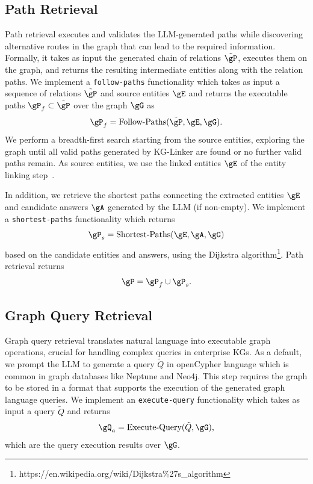 \documentclass[11pt]{article}
\begin{document}
\subsection{Path Retrieval}
Path retrieval executes and validates the LLM-generated paths while discovering alternative routes in the graph that can lead to the required information.
Formally, it takes as input the generated chain of relations $\tilde{\gP}$, executes them on the graph, and returns the resulting intermediate entities along with the relation paths. We implement a \texttt{follow-paths} functionality which takes as input a sequence of relations $\tilde{\gP}$ and source entities $\gE$ and returns the executable paths $\gP_f \subset \tilde{\gP}$ over the graph $\gG$ as
\begin{equation}
    \gP_f = \text{Follow-Paths}(\tilde{\gP}, \gE, \gG).
\end{equation}
We perform a breadth-first search starting from the source entities, exploring the graph until all valid paths generated by KG-Linker are found or no further valid paths remain. As source entities, we use the linked entities $\gE$ of the entity linking step~.

In addition, we retrieve the shortest paths connecting the extracted entities $\gE$ and candidate answers $\gA$ generated by the LLM (if non-empty). We implement a \texttt{shortest-paths} functionality which returns
\begin{equation}
    \gP_s = \text{Shortest-Paths}(\gE, \gA, \gG)
\end{equation}
based on the candidate entities and answers, using the Dijkstra algorithm\footnote{https://en.wikipedia.org/wiki/Dijkstra\%27s\_algorithm}. Path retrieval returns
\begin{equation}
    \gP = \gP_f \cup \gP_s.
\end{equation}

\subsection{Graph Query Retrieval}
Graph query retrieval translates natural language into executable graph operations, crucial for handling complex queries in enterprise KGs.
As a default, we prompt the LLM to generate a query $\tilde{Q}$ in openCypher language which is common in graph databases like Neptune and Neo4j. This step requires the graph to be stored in a format that supports the execution of the generated graph language queries. We implement  an \texttt{execute-query} functionality which takes as input a query $\tilde{Q}$ and returns 
\begin{equation}
    \gQ_a = \text{Execute-Query}(\tilde{Q}, \gG),
\end{equation}
which are the query execution results over $\gG$.
\end{document}
